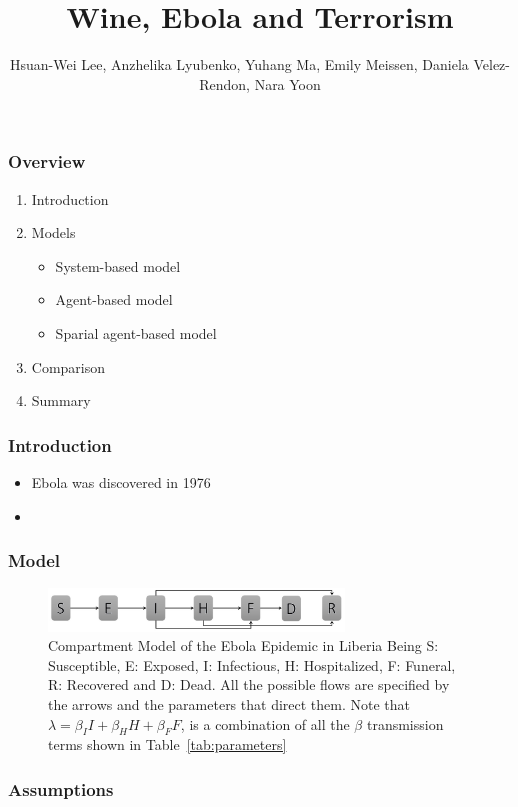 \documentclass[30pt]{beamer}
\author{ Hsuan-Wei Lee,
  Anzhelika Lyubenko,
  Yuhang Ma,
  Emily Meissen,
  Daniela Velez-Rendon,
    Nara Yoon}
\title[]{Wine, Ebola and Terrorism}
\begin{document}
\begin{frame}[t,plain]
    \titlepage
\end{frame}

\begin{frame}[t,plain]
    \frametitle{Overview}
\begin{enumerate}
\vfill
\item Introduction
\item Models
\begin{itemize}
\item System-based model
\item Agent-based model
\item Sparial agent-based model
\end{itemize}
\item Comparison
\item Summary
\end{enumerate}
\end{frame}

\begin{frame}
\frametitle{Introduction}
\begin{itemize}
\item Ebola was discovered in 1976
\item 
\end{itemize}
\end{frame}

\begin{frame}
\frametitle{Model}

\begin{figure}[!h]
  \centering
  \includegraphics[width=0.7\textwidth]{compartmentNoFlow}
  \caption{Compartment Model of the Ebola Epidemic in Liberia \newline  Being S: Susceptible, E: Exposed, I: Infectious, H: Hospitalized, F: Funeral,  R: Recovered and D: Dead. All the possible flows are specified by the arrows and the parameters that direct them. Note that $\lambda = \beta_{I}I+\beta_{H}H+\beta_{F}F $, is a combination of all the $\beta$ transmission terms shown in Table~\ref{tab:parameters} } 
\label{fig:compartment} 
\end{figure}
\end{frame}

\begin{frame}
\frametitle{Assumptions}
\end{frame}
\end{document}
